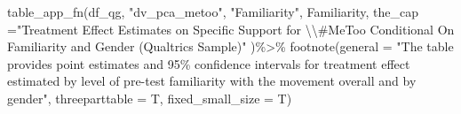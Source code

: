 \documentclass[
]{article}
\newenvironment{Shaded}{\begin{snugshade}}{\end{snugshade}}
\newcommand{\AttributeTok}[1]{\textcolor[rgb]{0.77,0.63,0.00}{#1}}
\newcommand{\FunctionTok}[1]{\textcolor[rgb]{0.00,0.00,0.00}{#1}}
\newcommand{\NormalTok}[1]{#1}
\newcommand{\SpecialCharTok}[1]{\textcolor[rgb]{0.00,0.00,0.00}{#1}}
\newcommand{\StringTok}[1]{\textcolor[rgb]{0.31,0.60,0.02}{#1}}
\begin{document}
\begin{Shaded}
\begin{Highlighting}[]
\FunctionTok{table\_app\_fn}\NormalTok{(df\_qg, }\StringTok{"dv\_pca\_metoo"}\NormalTok{,}
         \StringTok{"Familiarity"}\NormalTok{,}
\NormalTok{         Familiarity,}
         \AttributeTok{the\_cap =}\StringTok{"Treatment Effect Estimates on Specific Support for }\SpecialCharTok{\textbackslash{}\textbackslash{}}\StringTok{\#MeToo Conditional On Familiarity and Gender (Qualtrics Sample)"}\NormalTok{ )}\SpecialCharTok{\%\textgreater{}\%}
  \FunctionTok{footnote}\NormalTok{(}\AttributeTok{general =} \StringTok{"The table provides point estimates and 95\% confidence intervals for treatment effect estimated by level of pre{-}test familiarity with the movement overall and by gender"}\NormalTok{,}
           \AttributeTok{threeparttable =}\NormalTok{ T,}
           \AttributeTok{fixed\_small\_size =}\NormalTok{ T)}
\end{Highlighting}
\end{Shaded}
\end{document}
